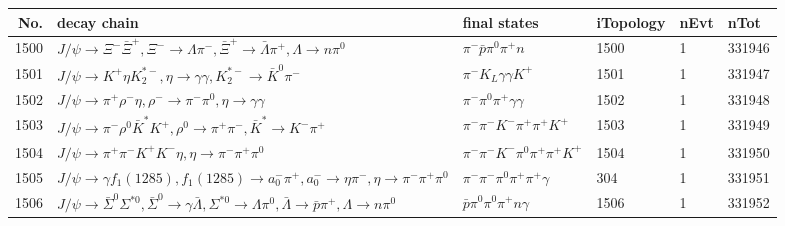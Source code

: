 \begin{table}[htbp] 
\begin{center}
\begin{small}
\begin{tabular}{rlllll}\hline\hline
 No. & decay chain & final states &  iTopology & nEvt & nTot \\\hline
1500&$J/\psi       \rightarrow \Xi^-             \bar{\Xi}^+      , \Xi^-              \rightarrow \Lambda           \pi^{-}        , \bar{\Xi}^+       \rightarrow \bar{\Lambda}    \pi^{+}        , \Lambda            \rightarrow n                 \pi^{0}        $&$\pi^{-}        \bar{p}          \pi^{0}        \pi^{+}        n                 $& 1500&    1&331946\\
1501&$J/\psi       \rightarrow K^{+}          \eta          K_2^{*-}       , \eta           \rightarrow \gamma       \gamma       , K_2^{*-}        \rightarrow \bar{K}^{0}   \pi^{-}        $&$\pi^{-}        K_{L}          \gamma       \gamma       K^{+}          $& 1501&    1&331947\\
1502&$J/\psi       \rightarrow \pi^{+}        \rho^{-}      \eta          , \rho^{-}       \rightarrow \pi^{-}        \pi^{0}        , \eta           \rightarrow \gamma       \gamma       $&$\pi^{-}        \pi^{0}        \pi^{+}        \gamma       \gamma       $& 1502&    1&331948\\
1503&$J/\psi       \rightarrow \pi^{-}        \rho^{0}      \bar{K}^{*}   K^{+}          , \rho^{0}       \rightarrow \pi^{+}        \pi^{-}        , \bar{K}^{*}    \rightarrow K^{-}          \pi^{+}        $&$\pi^{-}        \pi^{-}        K^{-}          \pi^{+}        \pi^{+}        K^{+}          $& 1503&    1&331949\\
1504&$J/\psi       \rightarrow \pi^{+}        \pi^{-}        K^{+}          K^{-}          \eta          , \eta           \rightarrow \pi^{-}        \pi^{+}        \pi^{0}        $&$\pi^{-}        \pi^{-}        K^{-}          \pi^{0}        \pi^{+}        \pi^{+}        K^{+}          $& 1504&    1&331950\\
1505&$J/\psi       \rightarrow \gamma       f_{1}(1285)    , f_{1}(1285)     \rightarrow a_{0}^{-}      \pi^{+}        , a_{0}^{-}       \rightarrow \eta          \pi^{-}        , \eta           \rightarrow \pi^{-}        \pi^{+}        \pi^{0}        $&$\pi^{-}        \pi^{-}        \pi^{0}        \pi^{+}        \pi^{+}        \gamma       $&  304&    1&331951\\
1506&$J/\psi       \rightarrow \bar{\Sigma}^0   \Sigma^{*0}       , \bar{\Sigma}^0    \rightarrow \gamma       \bar{\Lambda}    , \Sigma^{*0}        \rightarrow \Lambda           \pi^{0}        , \bar{\Lambda}     \rightarrow \bar{p}          \pi^{+}        , \Lambda            \rightarrow n                 \pi^{0}        $&$\bar{p}          \pi^{0}        \pi^{0}        \pi^{+}        n                 \gamma       $& 1506&    1&331952\\

\end{tabular}
\end{small}
\end{center}
\end{table}
